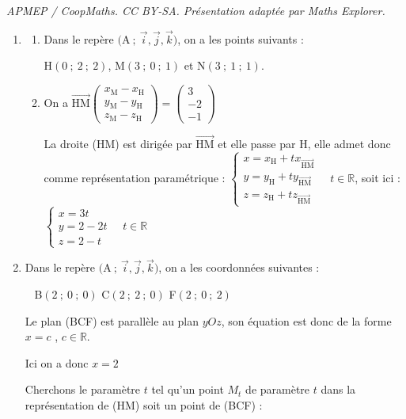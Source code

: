 \documentclass[10pt]{article}
\providecommand{\R}{\mathbb{R}}
\providecommand{\vect}[1]{\overrightarrow{#1}}
\begin{document}
\noindent\textit{APMEP / CoopMaths. CC BY-SA. Présentation adaptée par Maths Explorer.}\par\medskip
\begin{enumerate}
\item
	\begin{enumerate}
		\item Dans le repère $\big(\mathrm{A}~;~\vect{i},\vect{j},\vect{k}\big)$, on a les points suivants :

H$(0~;~2~;~2)$,  M$ (3~;~0~;~1) $ et N$(3~;~1~;~1)$. \hfill

\item On a  $\vect{\mathrm{HM}}\begin{pmatrix} x_\mathrm{M}-x_\mathrm{H}\\y_\mathrm{M}-y_\mathrm{H}\\z_\mathrm{M}-z_\mathrm{H} \end{pmatrix} = \begin{pmatrix} 3\\-2\\-1\end{pmatrix}$

La droite (HM) est dirigée par $\vect{\mathrm{HM}}$ et elle passe par H, elle admet donc comme représentation paramétrique : $ \left\{\begin{array}{l} x=x_\mathrm{H} + tx_{\vect{\mathrm{HM}}}\\y=y_\mathrm{H} + ty_{\vect{\mathrm{HM}}}\\z=z_\mathrm{H} + tz_{\vect{\mathrm{HM}}} \end{array}\right. \quad t \in \R $, soit ici : $ \left\{\begin{array}{l} x=3t\\y=2 -2 t\\z=2-t \end{array}\right. \quad t \in \R $
	\end{enumerate}
\item  Dans le repère $\big(\mathrm{A}~;~\vect{i},\vect{j},\vect{k}\big)$, on a les coordonnées suivantes :

\hfill~ B$(2~;~0~;~0)$ \hfill C$ (2~;~2~;~0) $ \hfill F$(2~;~0~;~2)$ \hfill

Le plan (BCF) est parallèle au plan $yOz$, son équation est donc de la forme $x=c$ , $c\in\R$.

Ici on a donc $x=2$

Cherchons le paramètre $t$ tel qu'un point $M_t$ de paramètre $t$ dans la représentation de (HM) soit un point de (BCF) :


\end{enumerate}
\end{document}
